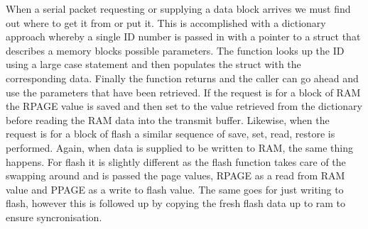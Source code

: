 \documentclass[12pt,a4paper,titlepage]{article}
\begin{document}
When a serial packet requesting or supplying a data block arrives we must find out where to get it from or put it. This is accomplished with a dictionary approach whereby a single ID number is passed in with a pointer to a struct that describes a memory blocks possible parameters. The function looks up the ID using a large case statement and then populates the struct with the corresponding data. Finally the function returns and the caller can go ahead and use the parameters that have been retrieved. If the request is for a block of RAM the RPAGE value is saved and then set to the value retrieved from the dictionary before reading the RAM data into the transmit buffer. Likewise, when the request is for a block of flash a similar sequence of save, set, read, restore is performed. Again, when data is supplied to be written to RAM, the same thing happens. For flash it is slightly different as the flash function takes care of the swapping around and is passed the page values, RPAGE as a read from RAM value and PPAGE as a write to flash value. The same goes for just writing to flash, however this is followed up by copying the fresh flash data up to ram to ensure syncronisation.
\end{document}
